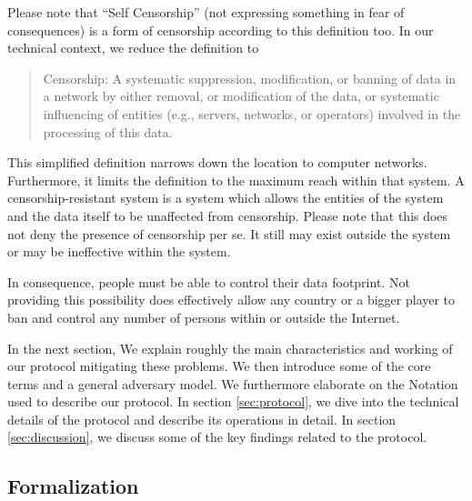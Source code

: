 \documentclass[10pt,journal,compsoc,twocolumn,twoside]{IEEEtran}
\begin{document}
Please note that ``Self Censorship'' (not expressing something in fear of consequences)  is a form of censorship according to this definition too. In our technical context, we reduce the definition to
\begin{quote}
	Censorship: A systematic suppression, modification, or banning of data in a network by either removal, or modification of the data, or systematic influencing of entities (e.g., servers, networks, or operators) involved in the processing of this data.
\end{quote}
This simplified definition narrows down the location to computer networks.  Furthermore, it limits the definition to the maximum reach within that system. A censorship-resistant system is a system which allows the entities of the system and the data itself to be unaffected from censorship. Please note that this does not deny the presence of censorship per se. It still may exist outside the system or may be ineffective within the system. 

In consequence, people must be able to control their data footprint. Not providing this possibility does effectively allow any country or a bigger player to ban and control any number of persons within or outside the Internet.  

In the next section, We explain roughly the main characteristics and working of our protocol mitigating these problems. We then introduce some of the core terms and a general adversary model. We furthermore elaborate on the Notation used to describe our protocol. In section \ref{sec:protocol}, we dive into the technical details of the protocol and describe its operations in detail. In section \ref{sec:discussion}, we discuss some of the key findings related to the protocol.

\subsection{Formalization}
\end{document}
